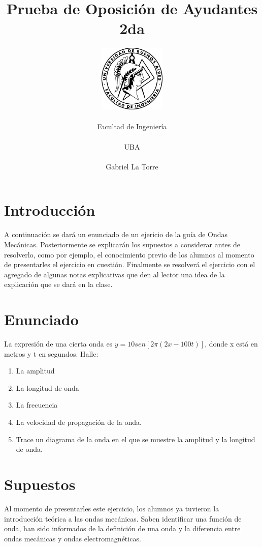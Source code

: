 \documentclass[spanish] {article}
\begin{document}
\title{Prueba de Oposición de Ayudantes 2da}
\author{\includegraphics[width=32mm]{logo-fiuba}\\ \\ \Huge Facultad de Ingeniería\\ \\ \Large UBA \\ \\ \Large Gabriel La Torre}

\maketitle
\newpage
\section{Introducción}
A continuación se dará un enunciado de un ejericio de la guía de Ondas Mecánicas. Posteriormente se explicarán los supuestos a considerar antes de resolverlo, como por ejemplo, el conocimiento previo de los alumnos al momento de presentarles el ejercicio en cuestión.
Finalmente se resolverá el ejercicio con el agregado de algunas notas explicativas que den al lector una idea de la explicación que se dará en la clase.
\section{Enunciado}
La expresión de una cierta onda es $y = 10 sen [2 \pi (2x- 100 t)]$, donde x está en metros y t en 
segundos. Halle: 
\begin{enumerate}
\item La amplitud
\item La longitud de onda
\item La frecuencia
\item La velocidad de propagación de la onda. 
\item Trace un diagrama de la onda en el que se muestre la amplitud y la longitud de onda. 
\end{enumerate}

\section{Supuestos}
Al momento de presentarles este ejercicio, los alumnos ya tuvieron la introducción teórica a las ondas mecánicas. Saben identificar una función de onda, han sido informados de la definición de una onda y la diferencia entre ondas mecánicas y ondas electromagnéticas.
\end{document}

